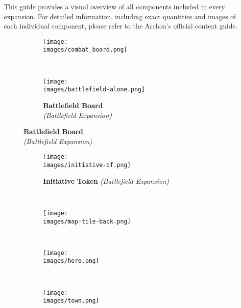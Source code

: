
This guide provides a visual overview of all components included in every expansion. For detailed information, including exact quantities and images of each individual component, please refer to the Archon's official content guide.

\vspace*{-1em}
\begin{figure}[H]
  \centering
  \begin{subfigure}[t]{0.4\linewidth}
    \texttt{[image: \\images/combat\_board.png]}
    \caption{\textbf{}}
  \end{subfigure}
  ~
  \begin{subfigure}[t]{0.4\linewidth}
    \texttt{[image: \\images/battlefield-alone.png]}
    \caption{\textbf{Battlefield Board} \\\textit{(Battlefield Expansion)}}
  \end{subfigure}
\end{figure}
\vspace*{-1.5em}
\begin{figure}[H]
  \centering
  \begin{subfigure}[b]{0.16\linewidth}
    \centering
    \texttt{[image: \\images/initiative-bf.png]}
    \caption{\textbf{Initiative Token} \textit{(Battlefield Expansion)}}
  \end{subfigure}
  ~
  \begin{subfigure}[b]{0.25\linewidth}
    \centering
    \texttt{[image: \\images/map-tile-back.png]}
    \caption{\textbf{}}
  \end{subfigure}
  ~
  \begin{subfigure}[b]{0.25\linewidth}
    \texttt{[image: \\images/hero.png]}
    \caption{\textbf{}}
  \end{subfigure}
  ~
  \begin{subfigure}[b]{0.25\linewidth}
    \texttt{[image: \\images/town.png]}
    \caption{\textbf{}}
  \end{subfigure}
\end{figure}
\vspace*{-1.7em}
